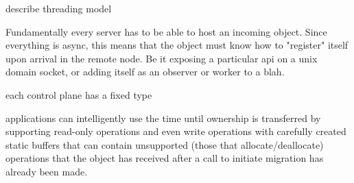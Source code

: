 describe threading model


Fundamentally every server has to be able to host an incoming object.
Since everything is async, this means that the object must know how to
"register" itself upon arrival in the remote node. Be it exposing a particular
api on a unix domain socket, or adding itself as an observer or worker to a blah.

each control plane has a fixed type

applications can intelligently use the time until ownership is transferred by
supporting read-only operations and even write operations with carefully
created static buffers that can contain unsupported (those that allocate/deallocate)
operations that the object has received after a call to initiate migration has
already been made.


